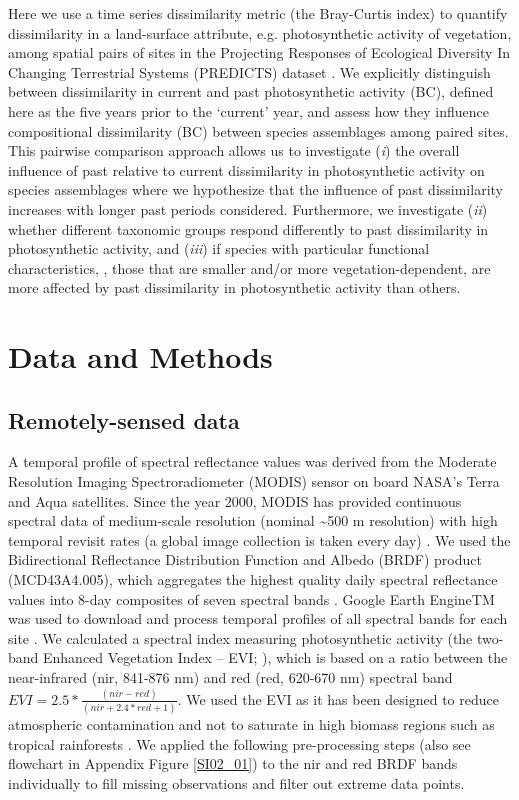 Here we use a time series dissimilarity metric (the Bray-Curtis index) to quantify dissimilarity in a land-surface attribute, e.g. photosynthetic activity of vegetation, among spatial pairs of sites in the Projecting Responses of Ecological Diversity In Changing Terrestrial Systems (PREDICTS) dataset \citep{Hudson2016}. We explicitly distinguish between dissimilarity in current and past photosynthetic activity (BC), defined here as the five years prior to the ‘current’ year, and assess how they influence compositional dissimilarity (BC) between species assemblages among paired sites. This pairwise comparison approach allows us to investigate (\textit{i}) the overall influence of past relative to current dissimilarity in photosynthetic activity on species assemblages where we hypothesize that the influence of past dissimilarity increases with longer past periods considered. Furthermore, we investigate (\textit{ii}) whether different taxonomic groups respond differently to past dissimilarity in photosynthetic activity, and (\textit{iii}) if species with particular functional characteristics, \ie, those that are smaller and/or more vegetation-dependent, are more affected by past dissimilarity in photosynthetic activity than others. 


\section{Data and Methods}
\subsection{Remotely-sensed data}
A temporal profile of spectral reflectance values was derived from the Moderate Resolution Imaging Spectroradiometer (MODIS) sensor on board NASA’s Terra and Aqua satellites. Since the year 2000, MODIS has provided continuous spectral data of medium-scale resolution (nominal \textasciitilde500 m resolution) with high temporal revisit rates (a global image collection is taken every day) \citep{Schaaf2002}. We used the Bidirectional Reflectance Distribution Function and Albedo (BRDF) product (MCD43A4.005), which aggregates the highest quality daily spectral reflectance values into 8-day composites of seven spectral bands \citep{Schaaf2002}. Google Earth EngineTM was used to download and process temporal profiles of all spectral bands for each site \citep{Gorelick2017}. We calculated a spectral index measuring photosynthetic activity (the two-band Enhanced Vegetation Index – EVI; \cite{Jiang2008}), which is based on a ratio between the near-infrared (nir, 841-876 nm) and red (red, 620-670 nm) spectral band \( EVI = 2.5 * \frac{(nir - red)}{(nir + 2.4 * red + 1)} \). We used the EVI as it has been designed to reduce atmospheric contamination and not to saturate in high biomass regions such as tropical rainforests \citep{Huete2002,Jiang2008}. We applied the following pre-processing steps (also see flowchart in Appendix Figure \ref{SI02_01}) to the nir and red BRDF bands individually to fill missing observations and filter out extreme data points. 

